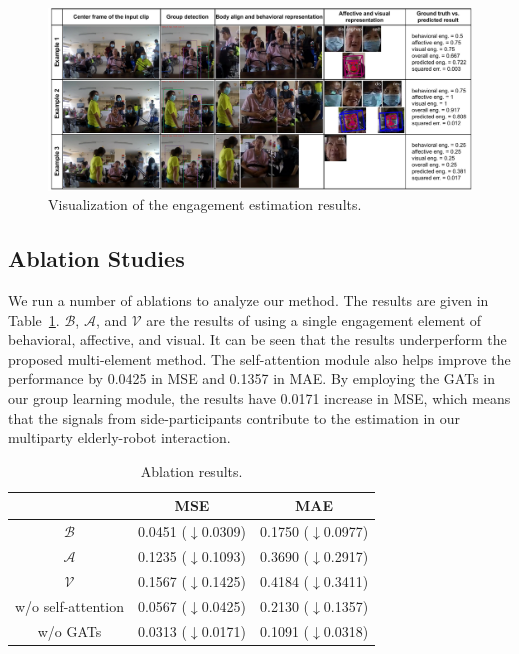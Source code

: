 \documentclass[twocolumn]{svjour3}
\begin{document}
\begin{figure}[t]
  \centering
  \includegraphics[width=\linewidth]{assets/visualization.drawio}
  \caption{Visualization of the engagement estimation results.}
  \label{f:visualization}
\end{figure}

\subsection{Ablation Studies}
\label{subs:Ablation_Studies}

We run a number of ablations to analyze our method. The results are given in Table~\ref{t:ablations}. $\mathcal{B}$, $\mathcal{A}$, and $\mathcal{V}$ are the results of using a single engagement element of behavioral, affective, and visual. It can be seen that the results underperform the proposed multi-element method. The self-attention module also helps improve the performance by 0.0425 in MSE and 0.1357 in MAE. By employing the GATs in our group learning module, the results have 0.0171 increase in MSE, which means that the signals from side-participants contribute to the estimation in our multiparty elderly-robot interaction.

\begin{table}[t]
  \centering
  \caption{Ablation results.}
  \label{t:ablations}
  \begin{tabular}{ccc}
  \toprule
  \textbf{} & \textbf{MSE} & \textbf{MAE} \\
  \midrule
  $\mathcal{B}$ & 0.0451 ($\downarrow$0.0309) & 0.1750 ($\downarrow$0.0977) \\
  $\mathcal{A}$ & 0.1235 ($\downarrow$0.1093) & 0.3690 ($\downarrow$0.2917) \\
  $\mathcal{V}$ & 0.1567 ($\downarrow$0.1425) & 0.4184 ($\downarrow$0.3411) \\
  w/o self-attention & 0.0567 ($\downarrow$0.0425) & 0.2130 ($\downarrow$0.1357) \\
  w/o GATs & 0.0313 ($\downarrow$0.0171) & 0.1091 ($\downarrow$0.0318) \\
  \bottomrule
  \end{tabular}
\end{table}
\end{document}

